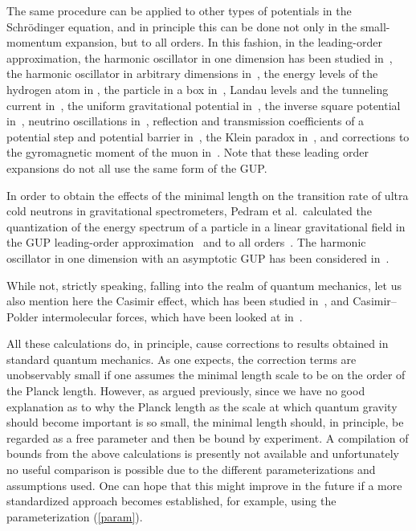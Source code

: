 \documentclass{article}
\begin{document}
The same procedure can be applied to other types of potentials in the Schr{\"o}dinger equation, and in principle this can be done not only in the
small-momentum expansion, but to all orders. In this fashion, in the leading-order approximation, 
the harmonic oscillator in one dimension has been
studied in~\cite{Kempf:1994su,Hossenfelder:2003jz,Ali:2011fa,Ghosh:2011ze}, the harmonic oscillator in 
arbitrary dimensions in~\cite{Chang:2011jj,Kempf:1996fz,Chang:2001kn,Dadic:2002qn}, the energy levels of the hydrogen atom in 
\cite{Hossenfelder:2003jz,Brau:1999uv,Stetskohydrogen,Bouaziz:2010he,Pedram:2012ub}, the particle in a box in~\cite{Ali:2009zq}, Landau levels and
the tunneling current in~\cite{Ali:2011fa,Das:2008kaa,Das:2009hs}, the uniform gravitational potential in~\cite{Nozari:2010qy,Chang:2011jj},
the inverse square potential in~\cite{Bouaziz:2007gs,Bouaziz:2010hc}, 
neutrino oscillations in~\cite{Sprenger:2010dg},
reflection and transmission coefficients of a potential step and potential barrier in~\cite{Ali:2011fa,Das:2009hs},
the Klein paradox in~\cite{Ghosh:2012cv}, 
and corrections to the gyromagnetic moment of the muon in~\cite{Harbach:2003qz,Das:2011tq}. Note that
these leading order expansions do not all use the same form of the {\sc GUP}. 

In order to obtain the effects of the minimal length on the transition rate of ultra cold neutrons in gravitational
spectrometers, Pedram et al.\ calculated
the quantization of the energy spectrum of a particle in a linear gravitational field in the {\sc GUP}
leading-order approximation~\cite{Pedram:2011xj} and to all orders~\cite{Pedram:2012pt}. The
harmonic oscillator in one dimension with an asymptotic GUP has been considered in~\cite{Pedram:2011aa,Pedram:2011gw}.

While not, strictly speaking, falling into the realm of quantum mechanics, let us also mention here
the Casimir effect, which has been studied in~\cite{Harbach:2005yu,Bachmann:2005km,Nouicer:2005dp,Frassino:2011aa,Dorsch:2011qf},
and Casimir--Polder intermolecular forces, which have been looked at in~\cite{Panella:2007kd}.

All these calculations do, in principle, cause corrections to results obtained in standard quantum
mechanics. As one expects, the correction terms are unobservably small
 if one assumes the minimal length scale to be on the order of the Planck length. However, as argued previously,
since we have no good explanation as to why the Planck length as the scale at which quantum gravity should
become important is so small, the minimal length should, in principle, be regarded as a free parameter 
and then be bound by
experiment. A compilation of bounds from the above calculations is presently not available and unfortunately 
no useful comparison is possible due to the different parameterizations and assumptions used. One
can hope that this might improve in the future if a more standardized approach becomes established,
for example, using the parameterization (\ref{param}). 
\end{document}
